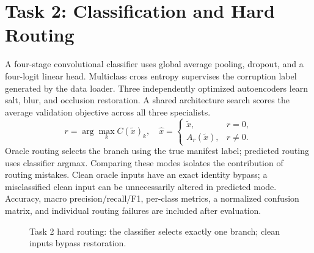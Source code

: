 \documentclass[conference]{IEEEtran}
\begin{document}
\section{Task 2: Classification and Hard Routing}
A four-stage convolutional classifier uses global average pooling, dropout,
and a four-logit linear head. Multiclass cross entropy supervises the corruption
label generated by the data loader. Three independently optimized autoencoders
learn salt, blur, and occlusion restoration. A shared architecture search scores
the average validation objective across all three specialists.
\begin{equation}
r=\arg\max_k C(\tilde{x})_k,\quad
\hat{x}=\begin{cases}\tilde{x},&r=0,\\A_r(\tilde{x}),&r\ne0.\end{cases}
\end{equation}
Oracle routing selects the branch using the true manifest label; predicted
routing uses classifier argmax. Comparing these modes isolates the contribution
of routing mistakes. Clean oracle inputs have an exact identity bypass; a
misclassified clean input can be unnecessarily altered in predicted mode.
Accuracy, macro precision/recall/F1, per-class metrics, a normalized confusion
matrix, and individual routing failures are included after evaluation.

\begin{figure}[!ht]\centering
{}\caption{Task 2 hard routing: the classifier selects exactly one branch; clean inputs bypass restoration.}\end{figure}
\end{document}
